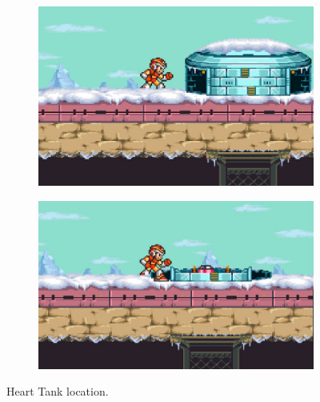 \begin{figure}[htp]
	\centering
	\begin{subfigure}{0.375\linewidth}
		\centering
		\includegraphics[width=\textwidth]{figures/X1/Chill_penguin/Chill_heart_1.jpg}	
		\caption{}
	\end{subfigure}
	\begin{subfigure}{0.4\linewidth}
		\centering
		\includegraphics[width=\textwidth]{figures/X1/Chill_penguin/Chill_heart_2.jpg}	
		\caption{}
	\end{subfigure}
	\caption{Heart Tank location.}
\end{figure}


